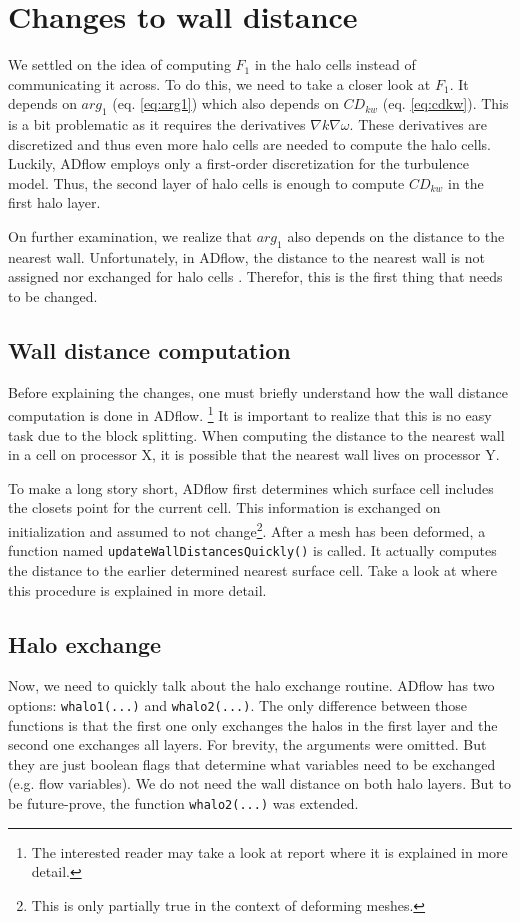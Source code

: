 \section{Changes to wall distance}
We settled on the idea of computing $F_1$ in the halo cells instead of
communicating it across. To do this, we need to take a closer look at $F_1$. It
depends on $arg_1$ (eq. \ref{eq:arg1}) which also depends on $CD_{kw}$ (eq.
\ref{eq:cdkw}). This is a bit problematic as it requires the derivatives
$\nabla k \nabla \omega$. These derivatives are discretized and thus even
more halo cells are needed to compute the halo cells. Luckily, ADflow employs
only a first-order discretization for the turbulence model. Thus, the second
layer of halo cells is enough to compute $CD_{kw}$ in the first halo layer.

On further examination, we realize that $arg_1$ also depends on the distance to
the nearest wall. Unfortunately, in ADflow, the distance to the nearest wall is
not assigned nor exchanged for halo cells . Therefor, this is the first thing
that needs to be changed.




\subsection{Wall distance computation}
Before explaining the changes, one must briefly understand how the wall
distance computation is done in ADflow. \footnote{The interested reader may
take a look at report \cite{vt1} where it is explained in more detail.} It is
important to realize that this is no easy task due to the block splitting. When
computing the distance to the nearest wall in a cell on processor X, it is
possible that the nearest wall lives on processor Y. 

To make a long story short, ADflow first determines which surface cell includes
the closets point for the current cell. This information is exchanged on
initialization and assumed to not change\footnote{This is only partially true
in the context of deforming meshes.}. After a mesh has been deformed, a
function named \texttt{updateWallDistancesQuickly()} is called. It actually
computes the distance to the earlier determined nearest surface cell. Take a
look at \cite{cm1} where this procedure is explained in more detail.




\subsection{Halo exchange}
Now, we need to quickly talk about the halo exchange routine. ADflow has two
options: \texttt{whalo1(...)} and \texttt{whalo2(...)}. The only difference
between those functions is that the first one only exchanges the halos in the
first layer and the second one exchanges all layers. For brevity, the arguments
were omitted. But they are just boolean flags that determine what variables
need to be exchanged (e.g. flow variables). We do not need the wall distance on
both halo layers. But to be future-prove,  the function \texttt{whalo2(...)}
was extended.

